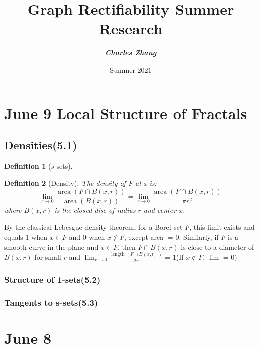 \documentclass[12pt, a4paper]{article}
\title{\textbf{Graph Rectifiability Summer Research} \\ [0.5cm] \sffamily{Daily Report\\(in reverse chronological order)}}
\author{\textbf{\textit{Charles Zhang}}}
\date{Summer 2021}
\newtheorem{definition}{Definition}[subsection]
\begin{document}
\maketitle

{
    \hypersetup{linkcolor=black}
    \tableofcontents
}

\newpage
\section{June 9 Local Structure of Fractals}
\subsection{Densities(5.1)}

\begin{definition}[$s$-sets]
    
\end{definition}
\begin{definition}[Density]
    The density of F at x is:
    $$
    \lim _{r \rightarrow 0} \frac{\operatorname{area}(F \cap B(x, r))}{\operatorname{area}(B(x, r))}=\lim _{r \rightarrow 0} \frac{\operatorname{area}(F \cap B(x, r))}{\pi r^{2}}
    $$
    where $B(x, r)$ is the closed disc of radius $r$ and center $x$.
\end{definition}

By the classical Lebesgue density theorem, for a Borel set $F$, this limit exists and equals $1$ when $x\in F$ and 0 when $x\notin F$, except area $=0$. Similarly, if $F$ is a smooth curve in the plane and $x\in F$, then $F\cap B(x, r)$ is close to a diameter of $B(x,r)$ for small $r$ and $\displaystyle \lim_{r\rightarrow 0}\frac{\operatorname{length}(F\cap B(x, t))}{2r} = 1$(If $x\notin F$, $\lim$ = 0)

\subsubsection{Structure of 1-sets(5.2)}



\subsubsection{Tangents to s-sets(5.3)}

\newpage
\section{June 8}
\end{document}

